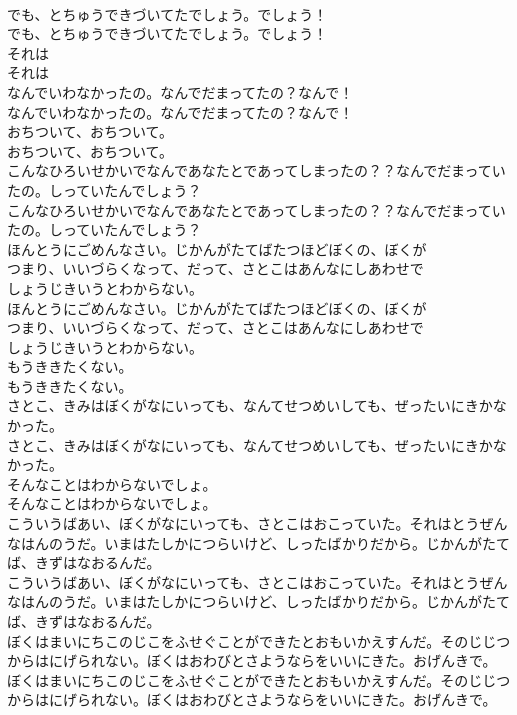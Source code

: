 \documentclass[8pt]{extreport}
\begin{document}
\begin{CJK}{UTF8}{min}
\\	でも、とちゅうできづいてたでしょう。でしょう！
\\	でも、とちゅうできづいてたでしょう。でしょう！
\\	それは
\\	それは
\\	なんでいわなかったの。なんでだまってたの？なんで！
\\	なんでいわなかったの。なんでだまってたの？なんで！
\\	おちついて、おちついて。
\\	おちついて、おちついて。
\\	こんなひろいせかいでなんであなたとであってしまったの？？なんでだまっていたの。しっていたんでしょう？
\\	こんなひろいせかいでなんであなたとであってしまったの？？なんでだまっていたの。しっていたんでしょう？
\\	ほんとうにごめんなさい。じかんがたてばたつほどぼくの、ぼくが
\\	つまり、いいづらくなって、だって、さとこはあんなにしあわせで
\\	しょうじきいうとわからない。
\\	ほんとうにごめんなさい。じかんがたてばたつほどぼくの、ぼくが
\\	つまり、いいづらくなって、だって、さとこはあんなにしあわせで
\\	しょうじきいうとわからない。
\\	もうききたくない。
\\	もうききたくない。
\\	さとこ、きみはぼくがなにいっても、なんてせつめいしても、ぜったいにきかなかった。
\\	さとこ、きみはぼくがなにいっても、なんてせつめいしても、ぜったいにきかなかった。
\\	そんなことはわからないでしょ。
\\	そんなことはわからないでしょ。
\\	こういうばあい、ぼくがなにいっても、さとこはおこっていた。それはとうぜんなはんのうだ。いまはたしかにつらいけど、しったばかりだから。じかんがたてば、きずはなおるんだ。
\\	こういうばあい、ぼくがなにいっても、さとこはおこっていた。それはとうぜんなはんのうだ。いまはたしかにつらいけど、しったばかりだから。じかんがたてば、きずはなおるんだ。
\\	ぼくはまいにちこのじこをふせぐことができたとおもいかえすんだ。そのじじつからはにげられない。ぼくはおわびとさようならをいいにきた。おげんきで。
\\	ぼくはまいにちこのじこをふせぐことができたとおもいかえすんだ。そのじじつからはにげられない。ぼくはおわびとさようならをいいにきた。おげんきで。

\end{CJK}
\end{document}
